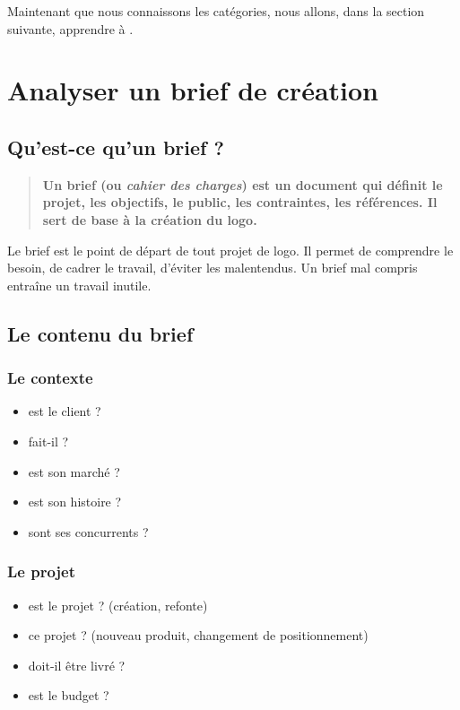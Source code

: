 Maintenant que nous connaissons les catégories, nous allons, dans la section suivante, apprendre à .

\section{Analyser un brief de création}

\subsection{Qu'est-ce qu'un brief ?}

\begin{quote}
\textbf{Un brief (ou \emph{cahier des charges}) est un document qui définit le projet, les objectifs, le public, les contraintes, les références. Il sert de base à la création du logo.}
\end{quote}

Le brief est le point de départ de tout projet de logo. Il permet de comprendre le besoin, de cadrer le travail, d'éviter les malentendus. Un brief mal compris entraîne un travail inutile.

\subsection{Le contenu du brief}

\subsubsection{Le contexte}

\begin{itemize}
    \item {} est le client ?
    \item {} fait-il ?
    \item {} est son marché ?
    \item {} est son histoire ?
    \item {} sont ses concurrents ?
\end{itemize}

\subsubsection{Le projet}

\begin{itemize}
    \item {} est le projet ? (création, refonte)
    \item {} ce projet ? (nouveau produit, changement de positionnement)
    \item {} doit-il être livré ?
    \item {} est le budget ?
\end{itemize}

